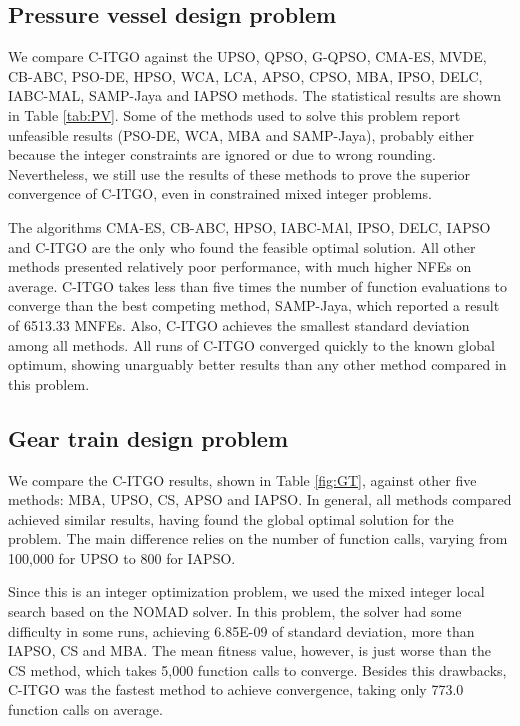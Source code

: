 \subsection{Pressure vessel design problem}




We compare C-ITGO against the UPSO, QPSO, G-QPSO, CMA-ES, MVDE, CB-ABC, PSO-DE, HPSO, WCA, LCA, APSO, CPSO, MBA, IPSO, DELC, IABC-MAL, SAMP-Jaya and IAPSO methods. The statistical results are shown in Table \ref{tab:PV}. Some of the methods used to solve this problem report unfeasible results (PSO-DE, WCA, MBA and SAMP-Jaya), probably either because the integer constraints are ignored or due to wrong rounding. Nevertheless, we still use the results of these methods to prove the superior convergence of C-ITGO, even in constrained mixed integer problems.





The algorithms CMA-ES, CB-ABC, HPSO, IABC-MAl, IPSO, DELC, IAPSO and C-ITGO are the only who found the feasible optimal solution. All other methods presented relatively poor performance, with much higher NFEs on average. C-ITGO takes less than five times the number of function evaluations to converge than the best competing method, SAMP-Jaya, which reported a result of 6513.33 MNFEs. Also, C-ITGO achieves the smallest standard deviation among all methods. All runs of C-ITGO converged quickly to the known global optimum, showing unarguably better results than any other method compared in this problem.



\subsection{Gear train design problem}




We compare the C-ITGO results, shown in Table \ref{fig:GT}, against other five methods: MBA, UPSO, CS, APSO and IAPSO. In general, all methods compared achieved similar results, having found the global optimal solution for the problem. The main difference relies on the number of function calls, varying from 100,000 for UPSO to 800 for IAPSO.




Since this is an integer optimization problem, we used the mixed integer local search based on the NOMAD solver. In this problem, the solver had some difficulty in some runs, achieving 6.85E-09 of standard deviation, more than IAPSO, CS and MBA. The mean fitness value, however, is just worse than the CS method, which takes 5,000 function calls to converge. Besides this drawbacks, C-ITGO was the fastest method to achieve convergence, taking only 773.0 function calls on average.



